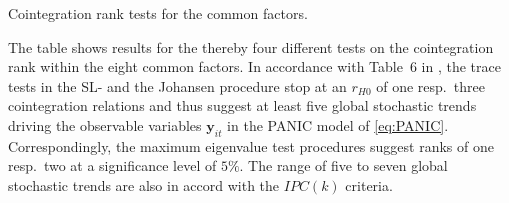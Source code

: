 \begin{table}[ht]	%
	\centering
	\caption[Cointegration rank tests]{Cointegration rank tests for the common factors.} 
	\resizebox{0.85\textwidth}{!}{
		}	
	\label{tab:MERMft}
\end{table}

The table shows results for the thereby four different tests on the cointegration rank within the eight common factors. In accordance with Table~6 in \citet[p.~68]{ArsovaOersal2017}, the trace tests in the SL- and the Johansen procedure stop at an $ r_{H0} $ of one resp.~three cointegration relations and thus suggest at least five global stochastic trends driving the observable variables $ \boldsymbol{y}_{it} $ in the PANIC model of \eqref{eq:PANIC}. Correspondingly, the maximum eigenvalue test procedures suggest ranks of one resp.~two at a significance level of $ 5 \% $. The range of five to seven global stochastic trends are also in accord with the $ IPC(k) $ criteria.



